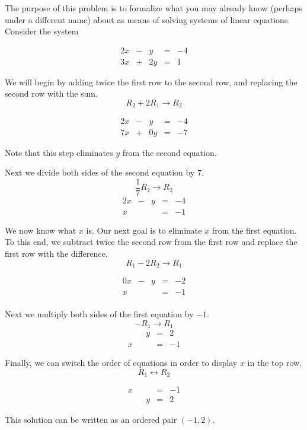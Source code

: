 \documentclass{ximera}
\begin{document}
\begin{exploration}\label{init:systwoeqs1} The purpose of this problem is to formalize what you may already know (perhaps under a different name) about  as means of solving systems of linear equations.  Consider the system

$$\begin{matrix}
      2x& -&y&=&-4\\
      3x & +&2y&= &1 
    \end{matrix}$$

We will begin by adding twice the first row to the second row, and replacing the second row with the sum. $$R_2+2R_1\rightarrow R_2$$

$$ \begin{matrix}
      2x& -&y&=&-4\\
      7x & +&0y&= &-7  
    \end{matrix}$$

Note that this step eliminates $y$ from the second equation.  

Next we divide both sides of the second equation by $7$. $$\frac{1}{7}R_2\rightarrow R_2$$
$$\begin{matrix}
       2x& -&y&=&-4\\
      x & &&= &-1
	   \end{matrix}$$
  
We now know what $x$ is.  Our next goal is to eliminate $x$ from the first equation.  To this end, we subtract twice the second row from the first row and replace the first row with the difference. $$R_1-2R_2\rightarrow R_1$$

$$\begin{matrix}
	 0x& -&y&=&-2\\
     x & &&= &-1 \\
    \end{matrix}$$

Next we multiply both sides of the first equation by $-1$. $$-R_1\rightarrow R_1$$
$$\begin{matrix}
      & &y&=&2\\
      x & &&= &-1
    \end{matrix}$$
 
    
Finally, we can switch the order of equations in order to display $x$ in the top row. $$R_1\leftrightarrow R_2$$  

$$\begin{matrix}
      x & &&= &-1\\
      & &y&=&2      
    \end{matrix}$$
  
This solution can be written as an ordered pair $(-1, 2)$.  
\end{exploration}
\end{document}
